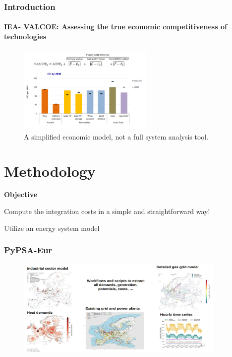 \documentclass[aspectratio=169]{beamer}
\begin{document}
\begin{frame}{\insertsectionhead}
\frametitle{Introduction}
\framesubtitle{IEA- VALCOE: Assessing the true economic competitiveness of technologies}
\begin{figure}
    \centering
    \includegraphics[width=0.58\textwidth]{valcoe.png}
  \caption*{\small A simplified economic model, not a full system analysis tool.}
  \end{figure}
\end{frame}
\section{Methodology}

\begin{frame}
  \centering
  \Large \textbf{Objective} \par
  \vspace{0.5em}
  \Large Compute the integration costs in a simple and straightforward way! \par
  \vspace{1em}
  \Large {Utilize an energy system model}
\end{frame}

\begin{frame}[fragile]
  \frametitle{PyPSA-Eur}
  \begin{figure}
    \centering
    \includegraphics[width=0.9\textwidth]{s12s186.jpg}
  \end{figure}
\end{frame}
\end{document}
